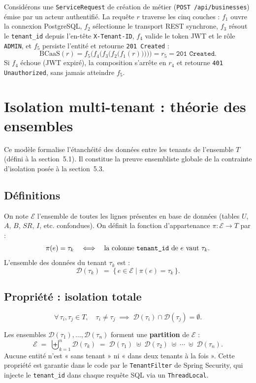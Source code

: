 Considérons une \texttt{ServiceRequest} de création de métier
(\texttt{POST /api/businesses}) émise par un acteur authentifié.
La requête $r$ traverse les cinq couches :
$f_1$ ouvre la connexion PostgreSQL,
$f_2$ sélectionne le transport REST synchrone,
$f_3$ résout le \texttt{tenant\_id} depuis l'en-tête \texttt{X-Tenant-ID},
$f_4$ valide le token JWT et le rôle \texttt{ADMIN},
et $f_5$ persiste l'entité et retourne \texttt{201 Created} :
\[
\text{BCaaS}(r) = f_5\bigl(f_4\bigl(f_3\bigl(f_2\bigl(f_1(r)\bigr)\bigr)\bigr)\bigr)
= r_5 = \texttt{201 Created}.
\]
Si $f_4$ échoue (JWT expiré), la composition s'arrête en $r_4$ et
retourne \texttt{401 Unauthorized}, sans jamais atteindre $f_5$.


\section{Isolation multi-tenant : théorie des ensembles}

Ce modèle formalise l'étanchéité des données entre les tenants de
l'ensemble $T$ (défini à la section~5.1). Il constitue la preuve
ensembliste globale de la contrainte d'isolation posée à la section~5.3.

\subsection{Définitions}

On note $\mathcal{E}$ l'ensemble de toutes les lignes présentes en base
de données (tables $U$, $A$, $B$, $SR$, $I$, etc. confondues).
On définit la fonction d'appartenance $\pi : \mathcal{E} \to T$ par :
\[
\pi(e) = \tau_k
\quad \Longleftrightarrow \quad
\text{la colonne \texttt{tenant\_id} de } e \text{ vaut } \tau_k.
\]
L'ensemble des données du tenant $\tau_k$ est :
\[
\mathcal{D}(\tau_k) \;=\; \bigl\{\, e \in \mathcal{E} \;\big|\; \pi(e) = \tau_k \,\bigr\}.
\]

\subsection{Propriété : isolation totale}

\[
\forall\, \tau_i, \tau_j \in T,\quad
\tau_i \neq \tau_j
\;\implies\;
\mathcal{D}(\tau_i) \cap \mathcal{D}(\tau_j) = \emptyset.
\]

Les ensembles $\mathcal{D}(\tau_1), \ldots, \mathcal{D}(\tau_n)$
forment une \textbf{partition} de $\mathcal{E}$ :
\[
\mathcal{E}
\;=\;
\biguplus_{k=1}^{n} \mathcal{D}(\tau_k)
\;=\;
\mathcal{D}(\tau_1) \;\uplus\; \mathcal{D}(\tau_2)
\;\uplus\; \cdots \;\uplus\; \mathcal{D}(\tau_n).
\]
Aucune entité n'est « sans tenant » ni « dans deux tenants à la fois ».
Cette propriété est garantie dans le code par le \texttt{TenantFilter}
de Spring Security, qui injecte le \texttt{tenant\_id} dans chaque
requête SQL via un \texttt{ThreadLocal}.

